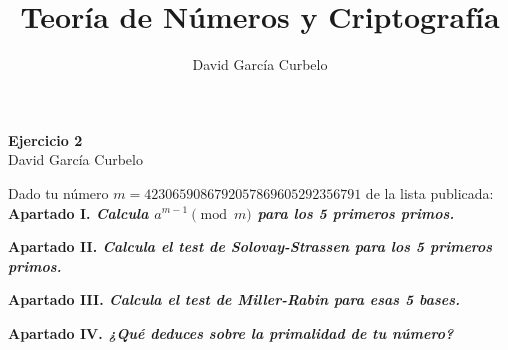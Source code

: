 \documentclass[fleqn]{article}
\author{David García Curbelo}
\title{Teoría de Números y Criptografía}
\begin{document}
    \begin{center}
        \LARGE{\textbf{Ejercicio 2}} \\
        \Large{David García Curbelo} \\
    \end{center}

    \vspace{1cm}
    
    Dado tu número $m = 4230659086792057869605292356791$  de la lista publicada: \\ 


    \textbf{Apartado I. \textit{Calcula $ a^{m-1} \pmod{m}$ para los 5 primeros primos.}} 

    \newpage
    \textbf{Apartado II. \textit{Calcula el test de Solovay-Strassen para los 5 primeros primos.}}

    \newpage
    \textbf{Apartado III. \textit{Calcula el test de Miller-Rabin para esas 5 bases.}}

    \newpage
    \textbf{Apartado IV. \textit{¿Qué deduces sobre la primalidad de tu número?}}
\end{document}
